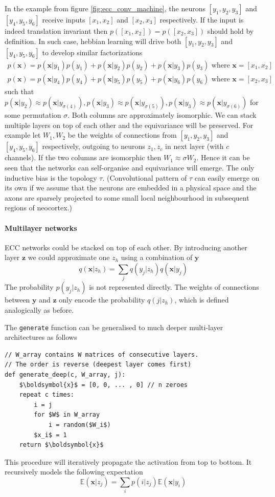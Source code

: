 \documentclass[12pt]{article}
\begin{document}
In the example from figure \ref{fig:ecc_conv_machine}, the neurons $[y_1,y_2,y_3]$ and $[y_4,y_5,y_6]$ receive inputs $[x_1,x_2]$ and $[x_2,x_3]$ respectively. If the input is indeed translation invariant then $p([x_1,x_2])=p([x_2,x_3])$ should hold by definition. In such case, hebbian learning will drive both $[y_1,y_2,y_3]$ and $[y_4,y_5,y_6]$ to develop similar factorizations
\begin{gather*}
	p(\boldsymbol{x}) = p(\boldsymbol{x}|y_1)p(y_1)+  p(\boldsymbol{x}|y_2)p(y_2)+  p(\boldsymbol{x}|y_3)p(y_3)\text{ where }\boldsymbol{x}=[x_1,x_2] \\
	p(\boldsymbol{x}) = p(\boldsymbol{x}|y_4)p(y_4)+  p(\boldsymbol{x}|y_5)p(y_5)+  p(\boldsymbol{x}|y_6)p(y_6)\text{ where }\boldsymbol{x}=[x_2,x_3]
\end{gather*}
such that $p(\boldsymbol{x}|y_2) \approx p(\boldsymbol{x}|y_{\sigma(4)}), p(\boldsymbol{x}|y_{3}) \approx p(\boldsymbol{x}|y_{\sigma(5)}),p(\boldsymbol{x}|y_3) \approx p(\boldsymbol{x}|y_{\sigma(6)}) $ for some permutation $\sigma$. Both columns are approximately isomorphic. We can stack multiple layers on top of each other and the equivariance will be preserved. For example let $W_1,W_2$ be the weights of connections from $[y_1,y_2,y_3]$ and   $[y_4,y_5,y_6]$ respectively, outgoing to  neurons $z_1,z_c$ in next layer (with $c$ channels). If the two columns are isomorphic then $W_1\approx\sigma W_2$. Hence it can be seen that the networks can self-organise and equivariance will emerge. The only inductive bias is the topology $\tau$. (Convolutional pattern of $\tau$ can easily emerge on its own if we assume that the neurons are embedded in a physical space and the axons are sparsely projected to some small local neighbourhood in subsequent regions of neocortex.)

\paragraph{Multilayer networks}
ECC networks could be stacked on top of each other. By introducing another layer $\boldsymbol{z}$ we could approximate one $z_h$ using a combination of   $\boldsymbol{y}$
\[
q(\boldsymbol{x}|z_h) = \sum_{j} q(y_j|z_h) q(\boldsymbol{x}|y_j)
\] 
The probability $p(y_j|z_h)$ is not represented directly. The weights of connections between $\boldsymbol{y}$ and $\boldsymbol{z}$ only encode the probability $q(j|z_h)$, which is defined analogically as before. 

The \texttt{generate} function can be generalised to much deeper multi-layer architectures as follows
\begin{lstlisting}
// W_array contains W matrices of consecutive layers.
// The order is reverse (deepest layer comes first)
def generate_deep(c, W_array, j):
    $\boldsymbol{x}$ = [0, 0, ... , 0] // n zeroes
    repeat c times:
        i = j
        for $W$ in W_array
            i = random($W_i$)
        $x_i$ = 1
    return $\boldsymbol{x}$
\end{lstlisting}
This procedure will iteratively propagate the activation from top to bottom. It recursively models the following expectation
\[
\mathbb{E}(\boldsymbol{x}|z_j) = \sum_{i} p(i|z_j) \mathbb{E}(\boldsymbol{x}|y_i)
\] 
\end{document}
